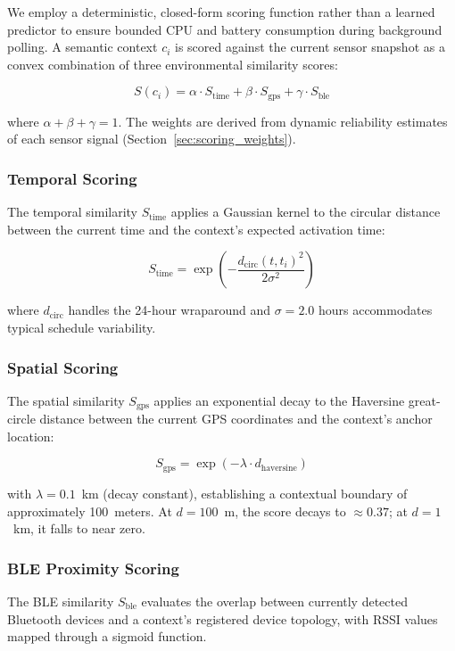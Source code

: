\documentclass[journal]{IEEEtran}
\begin{document}
We employ a deterministic, closed-form scoring function rather than a learned predictor to ensure bounded CPU and battery consumption during background polling. A semantic context $c_i$ is scored against the current sensor snapshot as a convex combination of three environmental similarity scores:

\begin{equation}
S(c_i) = \alpha \cdot S_{\text{time}} + \beta \cdot S_{\text{gps}} + \gamma \cdot S_{\text{ble}}
\label{eq:scoring}
\end{equation}

\noindent where $\alpha + \beta + \gamma = 1$. The weights are derived from dynamic reliability estimates of each sensor signal (Section~\ref{sec:scoring_weights}).

\subsubsection{Temporal Scoring}
The temporal similarity $S_{\text{time}}$ applies a Gaussian kernel to the circular distance between the current time and the context's expected activation time:

\begin{equation}
S_{\text{time}} = \exp\!\left(-\frac{d_{\text{circ}}(t, t_i)^2}{2\sigma^2}\right)
\label{eq:time_score}
\end{equation}

\noindent where $d_{\text{circ}}$ handles the 24-hour wraparound and $\sigma = 2.0$ hours accommodates typical schedule variability.

\subsubsection{Spatial Scoring}
The spatial similarity $S_{\text{gps}}$ applies an exponential decay to the Haversine great-circle distance between the current GPS coordinates and the context's anchor location:

\begin{equation}
S_{\text{gps}} = \exp(-\lambda \cdot d_{\text{haversine}})
\label{eq:gps_score}
\end{equation}

\noindent with $\lambda = 0.1$~km (decay constant), establishing a contextual boundary of approximately 100~meters. At $d = 100$~m, the score decays to $\approx 0.37$; at $d = 1$~km, it falls to near zero.

\subsubsection{BLE Proximity Scoring}
The BLE similarity $S_{\text{ble}}$ evaluates the overlap between currently detected Bluetooth devices and a context's registered device topology, with RSSI values mapped through a sigmoid function.
\end{document}
